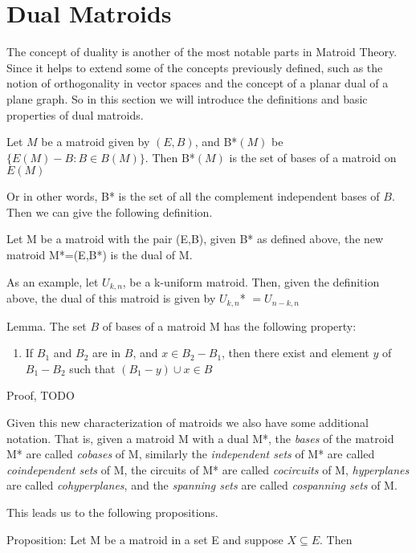 \section{Dual Matroids}
The concept of duality is another of the most notable parts in Matroid Theory. Since it helps to extend some of the concepts previously defined, such as the notion of orthogonality in vector spaces and the concept of a planar dual of a plane graph. So in this section we will introduce the definitions and basic properties of dual matroids.

\begin{theorem}
    Let $M$ be a matroid given by $(E,B)$, and B*$(M)$ be $\{E(M) - B:B\in B(M)\}$. Then B*$(M)$ is the set of bases of a matroid on $E(M)$
\end{theorem}

Or in other words, B* is the set of all the complement independent bases of $B$. Then we can give the following definition.

\begin{defn}
    Let M be a matroid with the pair (E,B), given B* as defined above, the new matroid M*=(E,B*) is the dual of M.
\end{defn}

As an example, let $U_{k,n}$, be a k-uniform matroid. Then, given the definition above, the dual of this matroid is given by $U_{k,n}$* $= U_{n-k,n}$

Lemma. The set $B$ of bases of a matroid M has the following property:
\begin{enumerate}
    \item If $B_1$ and $B_2$ are in $B$, and $x\in B_2 - B_1$, then there exist and element $y$ of $B_1 - B_2$ such that $(B_1 - y) \cup x \in B$ 
\end{enumerate}

Proof, TODO


    Given this new characterization of matroids we also have some additional notation. That is, given a matroid M with a dual M*, the \textit{bases} of the matroid M* are called \textit{cobases} of M, similarly the \textit{independent sets} of M* are called \textit{coindependent sets} of M, the circuits of M* are called \textit{cocircuits} of M, \textit{hyperplanes} are called \textit{cohyperplanes}, and the \textit{spanning sets} are called \textit{cospanning sets} of M.

This leads us to the following propositions.

Proposition:
Let M be a matroid in a set E and suppose $X \subseteq E$. Then


